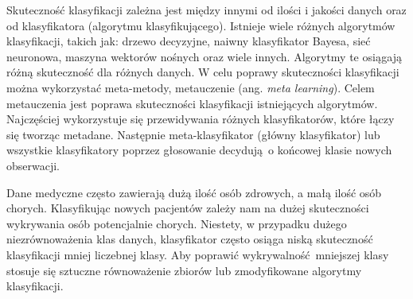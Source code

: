Skuteczność klasyfikacji zależna jest między innymi od ilości i jakości danych oraz od klasyfikatora (algorytmu klasyfikującego). Istnieje wiele różnych algorytmów klasyfikacji, takich jak: drzewo decyzyjne, naiwny klasyfikator Bayesa, sieć neuronowa, maszyna wektorów nośnych oraz wiele innych. Algorytmy te osiągają różną skuteczność dla różnych danych. W celu poprawy skuteczności klasyfikacji można wykorzystać meta-metody, metauczenie (ang. \textit{meta learning}). Celem metauczenia jest poprawa skuteczności klasyfikacji istniejących algorytmów. Najczęściej wykorzystuje się przewidywania różnych klasyfikatorów, które łączy się tworząc metadane. Następnie meta-klasyfikator (główny klasyfikator) lub wszystkie klasyfikatory poprzez głosowanie decydują o końcowej klasie nowych obserwacji. 	\par 
Dane medyczne często zawierają dużą ilość osób zdrowych, a małą ilość osób chorych. Klasyfikując nowych pacjentów zależy nam na dużej skuteczności wykrywania osób potencjalnie chorych. Niestety, w przypadku dużego niezrównoważenia klas danych, klasyfikator często osiąga niską skuteczność klasyfikacji mniej liczebnej klasy. Aby poprawić wykrywalność mniejszej klasy stosuje się sztuczne równoważenie zbiorów lub zmodyfikowane algorytmy klasyfikacji.